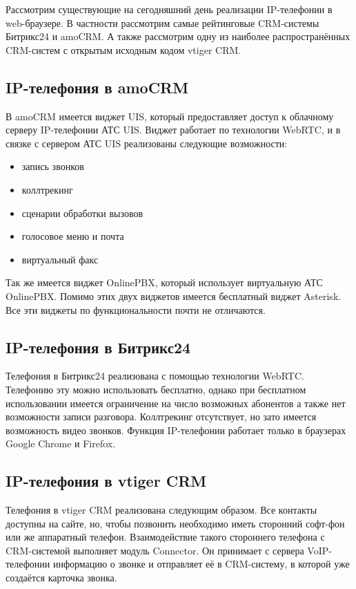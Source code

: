 Рассмотрим существующие на сегодняшний день реализации IP-телефонии в web-браузере. В частности рассмотрим самые рейтинговые CRM-системы Битрикс24 и amoCRM.\cite{bestCRMs} А также рассмотрим одну из наиболее распространённых CRM-систем с открытым исходным кодом vtiger CRM.

\subsection{IP-телефония в amoCRM}

В amoCRM имеется виджет UIS, который предоставляет доступ к облачному серверу IP-телефонии АТС UIS. Виджет работает по технологии WebRTC, и в связке с сервером АТС UIS реализованы следующие возможности\cite{amoCRM}:
\begin{itemize}
\item запись звонков
\item коллтрекинг
\item сценарии обработки вызовов
\item голосовое меню и почта
\item виртуальный факс
\end{itemize}

Так же имеется виджет OnlinePBX, который использует виртуальную АТС OnlinePBX. Помимо этих двух виджетов имеется бесплатный виджет Asterisk. Все эти виджеты по функциональности почти не отличаются.

\subsection{IP-телефония в Битрикс24}

Телефония в Битрикс24 реализована с помощью технологии WebRTC. Телефонию эту можно использовать бесплатно, однако при бесплатном использовании имеется ограничение на число возможных абонентов а также нет возможности записи разговора. Коллтрекинг отсутствует, но зато имеется возможность видео звонков. Функция IP-телефонии работает только в браузерах Google Chrome и Firefox.\cite{bitrix24}

\subsection{IP-телефония в vtiger CRM}

Телефония в vtiger CRM реализована следующим образом. Все контакты доступны на сайте, но, чтобы позвонить необходимо иметь сторонний софт-фон или же аппаратный телефон. Взаимодействие такого стороннего телефона с CRM-системой выполняет модуль Connector. Он принимает с сервера VoIP-телефонии информацию о звонке и отправляет её в CRM-систему, в которой уже создаётся карточка звонка.

